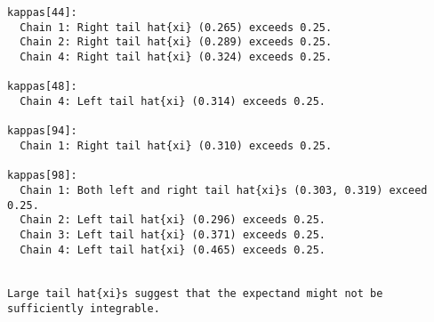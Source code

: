 \documentclass[
  letterpaper,
  DIV=11,
  numbers=noendperiod]{scrartcl}
\newenvironment{Shaded}{\begin{snugshade}}{\end{snugshade}}
\newcommand{\AttributeTok}[1]{\textcolor[rgb]{0.40,0.45,0.13}{#1}}
\newcommand{\ConstantTok}[1]{\textcolor[rgb]{0.56,0.35,0.01}{#1}}
\newcommand{\FunctionTok}[1]{\textcolor[rgb]{0.28,0.35,0.67}{#1}}
\newcommand{\NormalTok}[1]{\textcolor[rgb]{0.00,0.23,0.31}{#1}}
\newcommand{\OtherTok}[1]{\textcolor[rgb]{0.00,0.23,0.31}{#1}}
\newcommand{\SpecialCharTok}[1]{\textcolor[rgb]{0.37,0.37,0.37}{#1}}
\newcommand{\StringTok}[1]{\textcolor[rgb]{0.13,0.47,0.30}{#1}}
\begin{document}
\begin{Shaded}
\end{Shaded}

\begin{verbatim}
kappas[44]:
  Chain 1: Right tail hat{xi} (0.265) exceeds 0.25.
  Chain 2: Right tail hat{xi} (0.289) exceeds 0.25.
  Chain 4: Right tail hat{xi} (0.324) exceeds 0.25.

kappas[48]:
  Chain 4: Left tail hat{xi} (0.314) exceeds 0.25.

kappas[94]:
  Chain 1: Right tail hat{xi} (0.310) exceeds 0.25.

kappas[98]:
  Chain 1: Both left and right tail hat{xi}s (0.303, 0.319) exceed 0.25.
  Chain 2: Left tail hat{xi} (0.296) exceeds 0.25.
  Chain 3: Left tail hat{xi} (0.371) exceeds 0.25.
  Chain 4: Left tail hat{xi} (0.465) exceeds 0.25.


Large tail hat{xi}s suggest that the expectand might not be
sufficiently integrable.
\end{verbatim}
\end{document}
